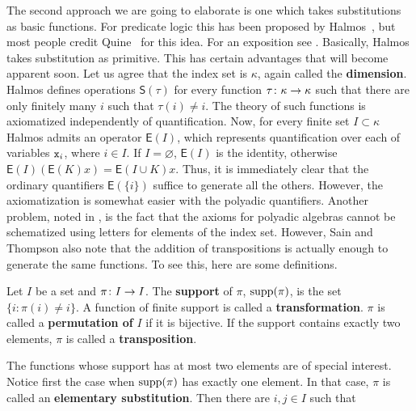 The second approach we are going to elaborate is one which takes
substitutions as basic functions. For predicate logic this has
been proposed by Halmos~, 
but most people credit Quine~ 
for this idea. For an exposition see \cite{pigozzisalibra:vb}.  
Basically, Halmos takes substitution as primitive. This has
certain advantages that will become apparent soon. Let us agree
that the index set is $\kappa$, again called the \textbf{dimension}.
Halmos defines operations $\mathsf{S}(\tau)$ for every function
$\tau \colon \kappa \rightarrow \kappa$ such that there are only finitely many
$i$ such that $\tau(i) \neq i$. The theory of such functions is
axiomatized independently of quantification. Now, for every finite
set $I \subset \kappa$ Halmos admits an operator $\mathsf{E}(I)$, 
which represents quantification over each of variables $\mbox{\tt x}_i$, 
where $i \in I$. If $I = \varnothing$, $\mathsf{E}(I)$ is the 
identity, otherwise $\mathsf{E}(I)(\mathsf{E}(K)x) = 
\mathsf{E}(I \cup K)x$. Thus, it is immediately clear
that the ordinary quantifiers $\mathsf{E}(\{i\})$ suffice to
generate all the others. However, the axiomatization is somewhat
easier with the polyadic quantifiers. Another problem, noted in
\cite{sainthompson:scheme}, is the fact that the axioms for polyadic 
algebras cannot be schematized using letters for elements of the 
index set. However, Sain and Thompson  
also note that the addition of transpositions is actually enough to 
generate the same functions. To see this, here are some definitions.
\begin{defn}
\index{$\supp(\pi)$}%
Let $I$ be a set and $\pi \colon I \rightarrow I$. The \textbf{support} of 
$\pi$, $\supp(\pi)$, is the set $\{i : \pi(i) \neq i\}$. A function 
of finite support is called a \textbf{transformation}.
$\pi$ is called a \textbf{permutation of} $I$ if it is bijective. If
the support contains exactly two elements, $\pi$ is called a 
\textbf{transposition}.
\end{defn}
The functions whose support has at most two elements are of
special interest. Notice first the case when $\supp(\pi)$
has exactly one element. In that case, $\pi$ is called an 
\textbf{elementary substitution}. Then there are $i, j \in I$ such that
